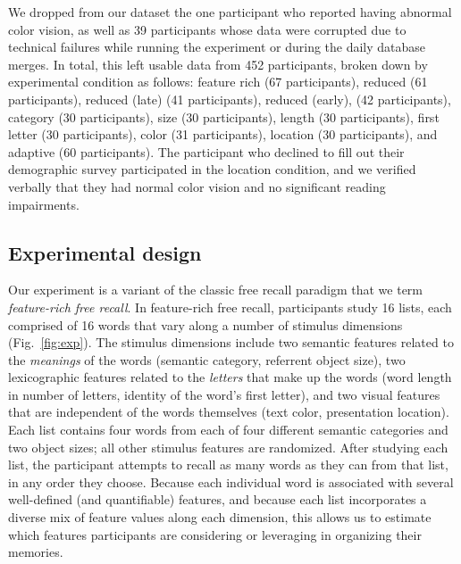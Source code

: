 \documentclass[11pt]{article}
\begin{document}
We dropped from our dataset the one participant who reported having abnormal
color vision, as well as 39 participants whose data were corrupted due to
technical failures while running the experiment or during the daily database
merges. In total, this left usable data from 452 participants, broken down by
experimental condition as follows: feature rich (67 participants), reduced (61
participants), reduced (late) (41 participants), reduced (early), (42
participants), category (30 participants), size (30 participants), length (30
participants), first letter (30 participants), color (31 participants),
location (30 participants), and adaptive (60 participants). The participant who
declined to fill out their demographic survey participated in the location
condition, and we verified verbally that they had normal color vision and no
significant reading impairments.




\subsection*{Experimental design}

Our experiment is a variant of the classic free recall paradigm that we term
\textit{feature-rich free recall}. In feature-rich free recall, participants
study 16 lists, each comprised of 16 words that vary along a number of stimulus
dimensions (Fig.~\ref{fig:exp}). The stimulus dimensions include two semantic
features related to the \textit{meanings} of the words (semantic category,
referrent object size), two lexicographic features related to the
\textit{letters} that make up the words (word length in number of letters,
identity of the word's first letter), and two visual features that are
independent of the words themselves (text color, presentation location). Each
list contains four words from each of four different semantic categories and
two object sizes; all other stimulus features are randomized. After studying
each list, the participant attempts to recall as many words as they can from
that list, in any order they choose. Because each individual word is associated
with several well-defined (and quantifiable) features, and because each list
incorporates a diverse mix of feature values along each dimension, this allows
us to estimate which features participants are considering or leveraging in
organizing their memories.
\end{document}
